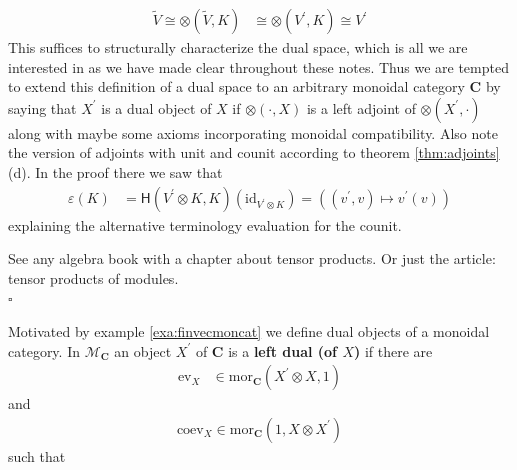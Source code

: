 \begin{exa}
\begin{align*}
  \tilde{V}
  \cong
  \otimes(\tilde{V},K)
  &\cong
  \otimes(V^{\prime},K)
  \cong
  V^{\prime}
\end{align*}
This suffices to structurally characterize the dual space, which is all we are interested in as we have made clear throughout these notes.
Thus we are tempted to extend this definition of a dual space to an arbitrary monoidal category $\mathbf{C}$ by saying that $X^{\prime}$ is a dual object of $X$ if $\otimes(\cdot,X)$ is a left adjoint of $\otimes(X^{\prime},\cdot)$ along with maybe some axioms incorporating monoidal compatibility.
Also note the version of adjoints with unit and counit according to theorem \ref{thm:adjoints} (d).
In the proof there we saw that
\begin{align*}
  \varepsilon(K)
  &=
  \mathsf{H}(V^{\prime} \otimes K,K)
  \left(
    \mathrm{id}_{V^{\prime} \otimes K}
  \right)
  =
  \left(
    (v^{\prime},v)
    \mapsto
    v^{\prime}(v)
  \right)
\end{align*}
explaining the alternative terminology evaluation for the counit.
\end{exa}
\begin{prf}
See any algebra book with a chapter about tensor products.
Or just the \cite{wiki-pedia0en} article: tensor products of modules.
\\
\phantom{proven}
\hfill
$\square$
\end{prf}
Motivated by example \ref{exa:finvecmoncat} we define dual objects of a monoidal category.
In $\mathcal{M}_{\mathbf{C}}$ an object $X^{\prime}$ of $\mathbf{C}$ is a \textbf{left dual (of $X$)} if there are
\begin{align*}
  \mathrm{ev}_{X}
  &\in
  \mathrm{mor}_{\mathbf{C}}
  \left(
    X^{\prime}
    \otimes
    X,
    1
  \right)
\end{align*}
and
\begin{align*}
  \mathrm{coev}_{X}
  \in
  \mathrm{mor}_{\mathbf{C}}
  \left(
    1,
    X
    \otimes
    X^{\prime}
  \right)
\end{align*}
such that
